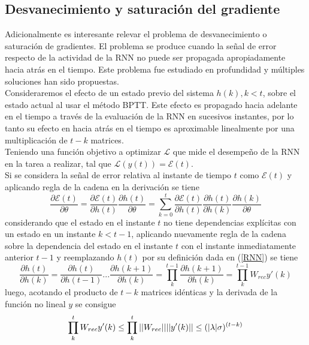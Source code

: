 \documentclass{article}
\begin{document}
	\subsection{Desvanecimiento y saturación del gradiente}
	Adicionalmente es interesante relevar el problema de desvanecimiento o saturación de gradientes. El problema se produce cuando la señal de error respecto de la actividad de la RNN no puede ser propagada apropiadamente hacia atrás en el tiempo. Este problema fue estudiado en profundidad y múltiples soluciones han sido propuestas.\\ 
	Consideraremos el efecto de un estado previo del sistema $h(k), k<t$, sobre el estado actual al usar el método BPTT. Este efecto es propagado hacia adelante en el tiempo a través de la evaluación de la RNN en sucesivos instantes, por lo tanto su efecto en hacia atrás en el tiempo es aproximable linealmente por una multiplicación de $t-k$ matrices.\\
	Teniendo una función objetivo a optimizar $\mathcal{L}$ que mide el desempeño de la RNN en la tarea a realizar, tal que $\mathcal{L}(y(t)) = \mathcal{E}(t)$. \\
	Si se considera la señal de error relativa al instante de tiempo $t$ como $\mathcal{E}(t)$ y aplicando regla de la cadena en la derivación se tiene
	\begin{equation*}
	\dfrac{\partial \mathcal{E}(t)}{\partial \theta} = \dfrac{\partial \mathcal{E}(t)}{\partial h(t)} \dfrac{\partial h(t)}{\partial \theta} =\sum_{k=0}^{t} \dfrac{\partial \mathcal{E}(t)}{\partial h(t)} \dfrac{\partial h(t)}{\partial h(k)}\dfrac{\partial h(k)}{\partial \theta}
	\end{equation*}
	considerando que el estado en el instante $t$ no tiene dependencias explícitas con un estado en un instante $k < t-1$, aplicando nuevamente regla de la cadena sobre la dependencia del estado en el instante $t$ con el instante inmediatamente anterior $t-1$ y reemplazando $h(t)$ por su definición dada en (\ref{RNN}) se tiene
	\begin{equation*}
	\dfrac{\partial h(t)}{\partial h(k)} = \dfrac{\partial h(t)}{\partial h(t-1)} ... \dfrac{\partial h(k+1)}{\partial h(k)} = \prod_{k}^{t-1} \dfrac{\partial h(k+1)}{\partial h(k)} = \prod_{k}^{t-1} W_{rec} y'(k)
	\end{equation*}
	luego, acotando el producto de $t-k$ matrices idénticas y la derivada de la función no lineal $y$ se consigue
	\begin{equation}\label{GradientProblem}
	\prod_{k}^{t} W_{rec} y'(k) \leq \prod_{k}^{t} ||W_{rec}|| \space ||y'(k)|| \leq (|\lambda| \sigma)^{(t-k)}
	\end{equation}
\end{document}
